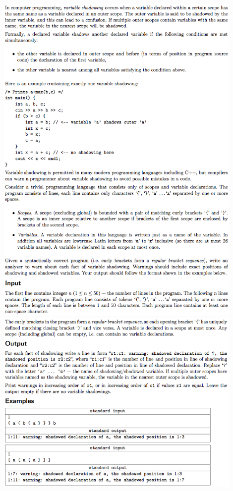 \documentclass[a4paper,12pt]{article}
\begin{document}
\begin{center}
\includegraphics[width=0.9\textwidth]{CT_ACM_WEST/CT_ACM_WEST_M1.png}\\ [1cm]
\includegraphics[width=0.9\textwidth]{CT_ACM_WEST/CT_ACM_WEST_M2.png}\\ [1cm]
\end{center}
\end{document}
